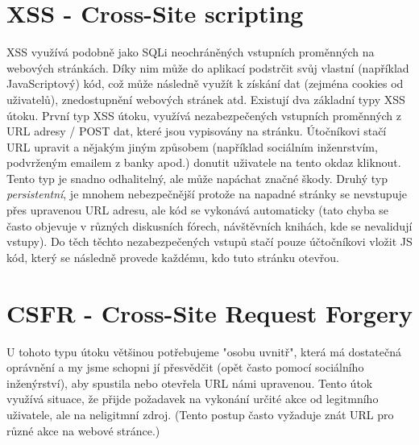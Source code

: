 \documentclass[12pt, a4paper]{report}
\begin{document}
\section{XSS - Cross-Site scripting}
XSS využívá podobně jako SQLi neochráněných vstupních proměnných na webových stránkách. Díky nim může do aplikací podstrčit svůj vlastní (například JavaScriptový) kód, což může následně využít k získání dat (zejména cookies od uživatelů), znedostupnění webových stránek atd. Existují dva základní typy XSS útoku. První typ XSS útoku, využívá nezabezpečených vstupních proměnných z URL adresy / POST dat, které jsou vypisovány na stránku. Útočníkovi stačí URL upravit a nějakým jiným způsobem (například sociálním inženrstvím, podvrženým emailem z banky apod.) donutit uživatele na tento okdaz kliknout. Tento typ je snadno odhalitelný, ale může napáchat značné škody. Druhý typ \textit{persistentní}, je mnohem nebezpečnější protože na napadné stránky se nevstupuje přes  upravenou URL adresu, ale kód se vykonává automaticky (tato chyba se často objevuje v různých diskusních fórech, návštěvních knihách, kde se nevalidují vstupy). Do těch těchto nezabezpečených vstupů stačí pouze účtočníkovi vložit JS kód, který se následně provede každému, kdo tuto stránku otevřou.
\section{CSFR - Cross-Site Request Forgery}
U tohoto typu útoku většinou potřebujeme "osobu uvnitř", která má dostatečná oprávnění a my jsme schopni jí přesvědčit (opět často pomocí sociálního inženýrství), aby spustila nebo otevřela URL námi upravenou. Tento útok využívá situace, že přijde požadavek na vykonání určité akce od legitmního uživatele, ale na neligitmní zdroj. (Tento postup často vyžaduje znát URL pro různé akce na webové stránce.)
\end{document}
